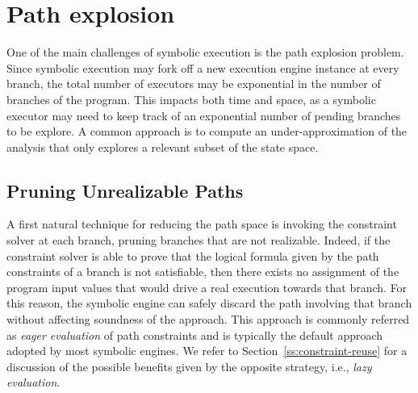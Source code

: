 
\section{Path explosion}
\label{se:path-explosion}

One of the main challenges of symbolic execution is the path explosion problem. Since symbolic execution may fork off a new execution engine instance at every branch, the total number of executors may be exponential in the number of branches of the program. This impacts both time and space, as a symbolic executor may need to keep track of an exponential number of pending branches to be explore. A common approach is to compute an under-approximation of the analysis that only explores a relevant subset of the state space.

\subsection{Pruning Unrealizable Paths}
\label{ss:unrealizable-paths}

A first natural technique for reducing the path space is invoking the constraint solver at each branch, pruning branches that are not realizable. Indeed, if the constraint solver is able to prove that the logical formula given by the path constraints of a branch is not satisfiable, then there exists no assignment of the program input values that would drive a real execution towards that branch. For this reason, the symbolic engine can safely discard the path involving that branch without affecting soundness of the approach. This approach is commonly referred as {\em eager evaluation} of path constraints and is typically the default approach adopted by most symbolic engines. We refer to Section~\ref{ss:constraint-reuse} for a discussion of the possible benefits given by the opposite strategy, i.e., {\em lazy evaluation}.

